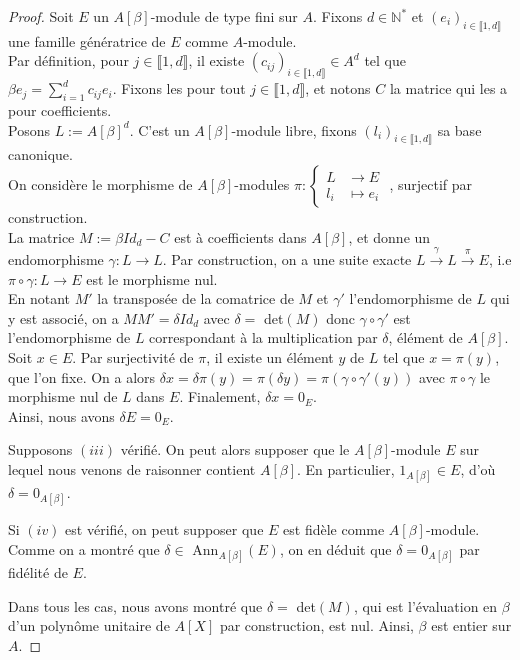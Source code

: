 \documentclass[10pt, twoside]{article}
\theoremstyle{plain}
\theoremstyle{definition}
\theoremstyle{plain}
\theoremstyle{plain}
\theoremstyle{definition}
\theoremstyle{remark}
\begin{document}
\begin{proof}
     Soit $E$ un $A[\beta]$-module de type fini sur $A$. Fixons $d \in \mathbb{N^*}$ et $(e_i)_{i \in \llbracket 1, d \rrbracket}$ une famille génératrice de $E$ comme $A$-module.\\ 
    Par définition, pour $j \in \llbracket 1, d \rrbracket$, il existe $(c_{ij})_{i \in \llbracket 1, d \rrbracket} \in A^d$ tel que $\beta e_j = \sum\limits_{i=1}^{d} c_{ij} e_i$. Fixons les pour tout $j \in \llbracket 1, d \rrbracket$, et notons $C$ la matrice qui les a pour coefficients.\\
    Posons $L := A[\beta]^d$. C'est un $A[\beta]$-module libre, fixons $(l_i)_{i \in \llbracket 1, d \rrbracket}$ sa base canonique.\\
    On considère le morphisme de $A[\beta]$-modules $\pi :
    \begin{cases}
        L &\longrightarrow E \\
        l_i &\longmapsto e_i
    \end{cases}$
    , surjectif par construction.\\
    La matrice $M := \beta Id_d - C$ est à coefficients dans $A[\beta]$, et donne un endomorphisme $\gamma : L \longrightarrow L$. Par construction, on a une suite exacte $L \overset{\gamma}{\longrightarrow} L \overset{\pi}{\longrightarrow} E$, i.e $\pi \circ \gamma : L \longrightarrow E$ est le morphisme nul.\\
    En notant $M'$ la transposée de la comatrice de $M$ et $\gamma'$ l'endomorphisme de $L$ qui y est associé, on a $MM' = \delta Id_d$ avec $\delta =$ det$(M)$ donc $\gamma \circ \gamma'$ est l'endomorphisme de $L$ correspondant à la multiplication par $\delta$, élément de $A[\beta]$.\\
    Soit $x \in E$. Par surjectivité de $\pi$, il existe un élément $y$ de $L$ tel que $x = \pi(y)$, que l'on fixe. On a alors $\delta x = \delta \pi(y) = \pi (\delta y) = \pi (\gamma \circ \gamma' (y))$ avec $\pi \circ \gamma$ le morphisme nul de $L$ dans $E$. Finalement, $\delta x = 0_E$.\\
    Ainsi, nous avons $\delta E = {0_E}$.
    
    Supposons $(iii)$ vérifié. On peut alors supposer que le $A[\beta]$-module $E$ sur lequel nous venons de raisonner contient $A[\beta]$. En particulier, $1_{A[\beta]} \in E$, d'où $\delta = 0_{A[\beta]}$.
    
    Si $(iv)$ est vérifié, on peut supposer que $E$ est fidèle comme $A[\beta]$-module. Comme on a montré que $\delta \in$ Ann$_{A[\beta]} (E)$, on en déduit que $\delta = 0_{A[\beta]}$ par fidélité de $E$.
    
    Dans tous les cas, nous avons montré que $\delta =$ det$(M)$, qui est l'évaluation en $\beta$ d'un polynôme unitaire de $A[X]$ par construction, est nul. Ainsi, $\beta$ est entier sur $A$.
\end{proof}
\end{document}
